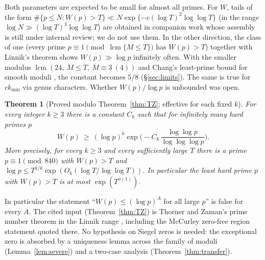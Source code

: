 \documentclass[11pt,reqno]{amsart}
\newtheorem{theorem}{Theorem}[section]
\theoremstyle{definition}
\newcommand{\lcm}{\operatorname{lcm}}
\newcommand{\ckmin}{ck_{\min}}
\begin{document}
\smallskip
Both parameters are expected to be small for almost all primes.  For $W$,
tails of the form
$\#\{p\le N:W(p)>T\}\ll N\exp\{-c(\log T)^2\log\log T\}$ (in the range
$\log N\gg(\log T)^3\log\log T$) are obtained in companion work whose
assembly is still under internal review; we do not use them.  In the other
direction, the class of one (every prime $p\equiv1\pmod{\lcm\{M\le T\}}$ has
$W(p)>T$) together with Linnik's theorem shows $W(p)\gg\log p$
infinitely often.  With the smaller modulus $\lcm(24,\ M\le T,\ M\equiv3\ (4))$
and Chang's least-prime bound for smooth moduli \cite{Chang}, the constant
becomes $5/8$ (\S\ref{sec:limits}).  The same is true for $\ckmin$ via
genus characters.  Whether $W(p)/\log p$ is unbounded was open.

\begin{theorem}[Proved modulo Theorem~\ref{thm:TZ}; effective for each fixed $k$]\label{thm:main}
For every integer $k\ge3$ there is a constant $C_k$ such that for infinitely
many hard primes $p$
\[
 W(p)\ \ge\ (\log p)^k\exp\Big(-C_k\,\frac{\log\log p}{\log\log\log p}\Big).
\]
More precisely, for every $k\ge3$ and every sufficiently large $T$ there is a
prime $p\equiv1\pmod{840}$ with $W(p)>T$ and
$\log p\le T^{1/k}\exp(O_k(\log T/\log\log T))$.  In particular the least hard
prime $p$ with $W(p)>T$ is at most $\exp(T^{o(1)})$.
\end{theorem}

In particular the statement ``$W(p)\le(\log p)^A$ for all large $p$'' is
false for every $A$.  The cited input (Theorem~\ref{thm:TZ}) is Thorner and
Zaman's prime number theorem in the Linnik range \cite{TZ}, including the
McCurley zero-free region statement quoted there.  No hypothesis on Siegel
zeros is needed: the exceptional zero is absorbed by a uniqueness lemma
across the family of moduli (Lemma~\ref{lem:severe}) and a two-case
analysis (Theorem~\ref{thm:transfer}).
\end{document}

